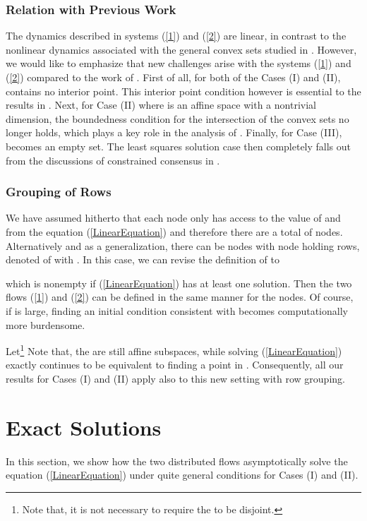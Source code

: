 \documentclass[a4paper, 11pt]{article}
\begin{document}
\subsubsection{Relation with Previous Work}
The dynamics described in systems (\ref{1}) and (\ref{2}) are linear, in contrast to the nonlinear dynamics associated with the general convex sets  studied in \cite{nedic10,shitac}. However, we would like to emphasize that new challenges arise with the   systems (\ref{1}) and (\ref{2}) compared to the work of \cite{nedic10,shitac}. First of all, for both of the Cases (I) and (II),  contains no interior point. This interior point condition  however is essential to the  results   in   \cite{nedic10}.
Next, for Case (II) where   is an affine space with a nontrivial dimension, the boundedness condition for the intersection of the convex sets no longer holds, which plays a key role in the analysis of  \cite{nedic10,shitac}. Finally, for Case (III),   becomes an empty set. The least squares solution case then completely falls out from the discussions of constrained consensus in \cite{shitac,nedic10}.

\subsubsection{Grouping of Rows}

We have assumed hitherto that each node  only has access to the value of  and  from the equation (\ref{LinearEquation}) and therefore there are a total of  nodes. Alternatively and as a generalization, there can be  nodes with node  holding  rows, denoted  of  with . In this case, we can revise the definition of  to

which is nonempty if (\ref{LinearEquation}) has at least one solution. Then the two flows (\ref{1}) and (\ref{2}) can be defined in the same manner for the  nodes. Of course, if  is large, finding an initial condition consistent with  becomes computationally more burdensome.

Let\footnote{Note that, it is not necessary to require the  to be disjoint.} 
Note  that,  the  are still affine subspaces,  while solving (\ref{LinearEquation}) exactly  continues to be equivalent to finding a point in . Consequently, all our results for Cases (I) and (II) apply also to this new setting with row grouping.


\section{Exact Solutions}\label{Sec:exact}
In this section, we show how the two distributed flows  asymptotically  solve the equation (\ref{LinearEquation}) under quite general conditions for Cases (I) and (II).
\end{document}
